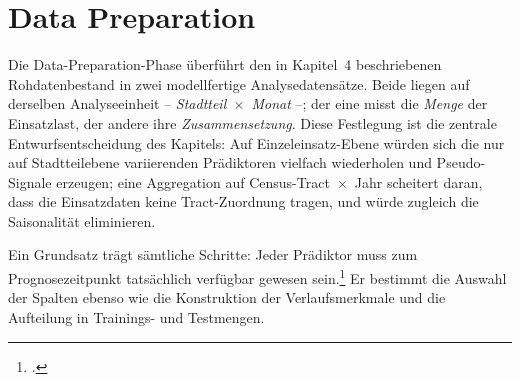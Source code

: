 \documentclass[12pt,a4paper]{article}
\begin{document}

\section{Data Preparation}
\label{sec:data-preparation}

%

Die Data-Preparation-Phase überführt den in Kapitel~4 beschriebenen
Rohdatenbestand in zwei modellfertige Analysedatensätze. Beide liegen auf
derselben Analyseeinheit -- \emph{Stadtteil~$\times$~Monat} --; der eine misst
die \emph{Menge} der Einsatzlast, der andere ihre \emph{Zusammensetzung}. Diese
Festlegung ist die zentrale Entwurfsentscheidung des Kapitels: Auf
Einzeleinsatz-Ebene würden sich die nur auf Stadtteilebene variierenden
Prädiktoren vielfach wiederholen und Pseudo-Signale erzeugen; eine Aggregation
auf Census-Tract~$\times$~Jahr scheitert daran, dass die Einsatzdaten keine
Tract-Zuordnung tragen, und würde zugleich die Saisonalität eliminieren.

Ein Grundsatz trägt sämtliche Schritte: Jeder Prädiktor muss zum
Prognosezeitpunkt tatsächlich verfügbar gewesen sein.\footcite[192-193]{Bergmeir2012}
Er bestimmt die Auswahl der Spalten ebenso wie die Konstruktion der
Verlaufsmerkmale und die Aufteilung in Trainings- und Testmengen.

\end{document}
